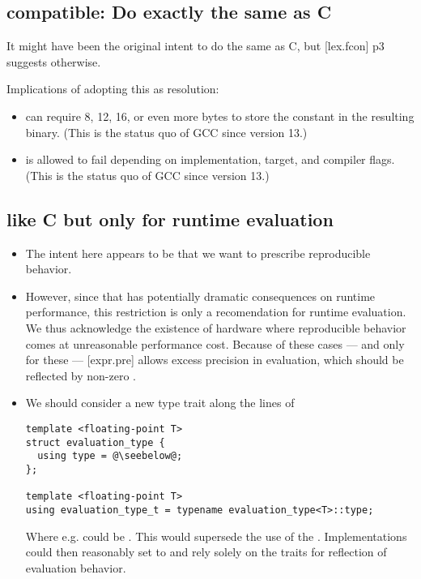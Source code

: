 \subsection{compatible: Do exactly the same as C}\label{d:2}

It might have been the original intent to do the same as C, but [lex.fcon] p3
suggests otherwise.

Implications of adopting this as resolution:
\begin{itemize}
  \item {} can require 8, 12, 16, or even more bytes to store
    the constant in the resulting binary.
    (This is the status quo of GCC since version 13.)

  \item {} is allowed to fail
    depending on implementation, target, and compiler flags.
    (This is the status quo of GCC since version 13.)
\end{itemize}

\subsection{like C but only for runtime evaluation}\label{d:3}

\begin{itemize}
  \item The intent here appears to be that we want to prescribe reproducible
    \fp behavior.

  \item However, since that has potentially dramatic consequences on runtime
    performance, this restriction is only a recomendation for runtime
    evaluation.
    We thus acknowledge the existence of hardware where reproducible \fp
    behavior comes at unreasonable performance cost.
    Because of these cases --- and only for these --- [expr.pre] allows excess
    precision in evaluation, which should be reflected by non-zero
    .

  \item We should consider a new type trait along the lines of
    \begin{lstlisting}
template <floating-point T>
struct evaluation_type {
  using type = @\seebelow@;
};

template <floating-point T>
using evaluation_type_t = typename evaluation_type<T>::type;
    \end{lstlisting}
    Where e.g.  could be .
    This would supersede the use of the .
    Implementations could then reasonably set  to
     and rely solely on the traits for reflection of \fp evaluation
    behavior.
\end{itemize}
